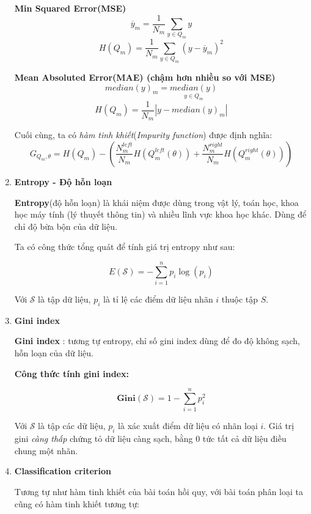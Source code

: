 \documentclass[../main-report.tex]{subfiles}
\begin{document}
\begin{enumerate}
\textbf{Min Squared Error(MSE)}
  $$\overline{y}_{m} = \frac{1}{N_{m}} \sum_{y\in Q_{m}}y$$
  $$H(Q_{m}) = \frac{1}{N_{m}}\sum_{y\in Q_{m}}(y - \overline{y}_{m})^{2}$$

\textbf{ Mean Absoluted Error(MAE) (chậm hơn nhiều so với MSE)}
$$median(y)_{m} = \underset{y\in Q_{m}}{median(y)}$$
$$H(Q_{m}) = \frac{1}{N_{m}}|y - median(y)_{m}|$$

    Cuối cùng, ta có \textit{hàm tinh khiết}(\textit{Impurity function}) được định nghĩa:
\begin{equation}
    G_{Q_{m}, \theta} = H(Q_{m}) - (\frac{N_{m}^{left}}{N_{m}}H(Q^{left}_{m}(\theta)) + \frac{N_{m}^{right}}{N_{m}}H(Q^{right}_{m}(\theta)))
\end{equation}

\item \textbf{Entropy - Độ hỗn loạn}

\textbf{Entropy}(độ hỗn loạn) là khái niệm được dùng trong vật lý, toán học, khoa học máy tính (lý thuyết thông tin) và nhiều lĩnh vực khoa học khác. Dùng để chỉ độ bừa bộn của dữ liệu.

Ta có công thức tổng quát để tính giá trị entropy như sau:

\begin{equation}
E(\mathcal{S}) = -\sum_{i=1}^n p_i \log(p_i)
\end{equation}

Với $\mathcal{S}$ là tập dữ liệu, $p_i$ là tỉ lệ các điểm dữ liệu nhãn $i$ thuộc tập $S$.

\item \textbf{Gini index} 

\textbf{Gini index} : tương tự entropy, chỉ số gini index dùng để đo độ không sạch, hỗn loạn của dữ liệu.

\textbf{Công thức tính gini index:}

\begin{equation}
\mathbf{Gini}(\mathcal{S}) = 1 - \sum_{i=1}^n p^{2}_{i}
\end{equation}

Với $\mathcal{S}$ là  tập các dữ liệu, $p_i$ là xác xuất điểm dữ liệu có nhãn loại $i$. Giá trị gini \emph{càng thấp} chứng tỏ dữ liệu càng sạch, bằng 0 tức tất cả dữ liệu điều chung một nhãn.

\item \textbf{Classification criterion}

Tương tự như hàm tinh khiết của bài toán hồi quy, với bài toán phân loại ta cũng có hàm tinh khiết tương tự:


\end{enumerate}
\end{document}
